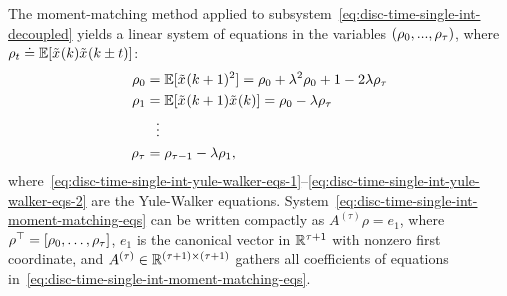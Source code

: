 The moment-matching method applied to subsystem~\eqref{eq:disc-time-single-int-decoupled} yields 
a linear system of equations in the variables $ (\rho_0,...,\rho_\tau) $,
where $ \rho_t \doteq \mathbb{E}[\tilde{x}_{}(k)\tilde{x}_{}(k\pm t)] $:
\begin{subequations}\label{eq:disc-time-single-int-moment-matching-eqs}
	\begin{align}
		\rho_0 &= \mathbb{E}[\tilde{x}_{}(k+1)^2] = \rho_0 + \lambda^2\rho_0 + 1 - 2\lambda\rho_\tau \label{eq:disc-time-single-int-first-moment-eq}\\
		\rho_1 &= \mathbb{E}[\tilde{x}_{}(k+1)\tilde{x}_{}(k)] = \rho_0 - \lambda\rho_\tau \label{eq:disc-time-single-int-yule-walker-eqs-1}\\
		&\hspace{2mm}\vdots \nonumber \\
		\rho_\tau &= \rho_{\tau-1} - \lambda\rho_1, \label{eq:disc-time-single-int-yule-walker-eqs-2}
	\end{align}
\end{subequations}
where~\eqref{eq:disc-time-single-int-yule-walker-eqs-1}--\eqref{eq:disc-time-single-int-yule-walker-eqs-2} are the Yule-Walker equations.
System~\eqref{eq:disc-time-single-int-moment-matching-eqs}
can be written compactly as $ A^{(\tau)}\rho = e_1 $, 
where $ \rho^\top = [\rho_0,\dots,\rho_{\tau}]$,
$ e_1 $ is the canonical vector in $ { {\mathbb R}^{\tau+1} } $ with nonzero first coordinate,
and $ A^{(\tau)}\in{ {\mathbb R}^{(\tau+1)\times(\tau+1)} } $ gathers all coefficients of equations in~\eqref{eq:disc-time-single-int-moment-matching-eqs}.
